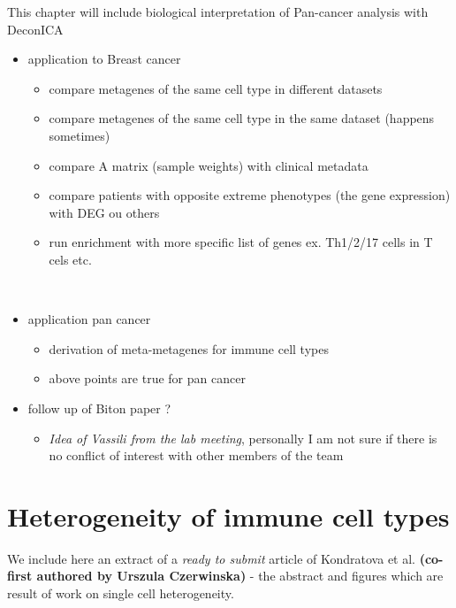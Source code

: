 \documentclass[12pt,]{book}
\providecommand{\tightlist}{%
  \setlength{\itemsep}{0pt}\setlength{\parskip}{0pt}}
\theoremstyle{definition}
\theoremstyle{definition}
\theoremstyle{definition}
\theoremstyle{remark}
\begin{document}
This chapter will include biological interpretation of Pan-cancer
analysis with DeconICA

\begin{itemize}
\item
  application to Breast cancer

  \begin{itemize}
  \item
    compare metagenes of the same cell type in different datasets
  \item
    compare metagenes of the same cell type in the same dataset (happens
    sometimes)
  \item
    compare A matrix (sample weights) with clinical metadata
  \item
    compare patients with opposite extreme phenotypes (the gene
    expression) with DEG ou others
  \item
    run enrichment with more specific list of genes ex. Th1/2/17 cells
    in T cels etc.

    ​
  \end{itemize}
\item
  application pan cancer

  \begin{itemize}
  \tightlist
  \item
    derivation of meta-metagenes for immune cell types
  \item
    above points are true for pan cancer
  \end{itemize}
\item
  follow up of Biton paper ?

  \begin{itemize}
  \tightlist
  \item
    \emph{Idea of Vassili from the lab meeting}, personally I am not
    sure if there is no conflict of interest with other members of the
    team
  \end{itemize}
\end{itemize}

\hypertarget{map}{%
\chapter{Heterogeneity of immune cell types}\label{map}}

We include here an extract of a \emph{ready to submit} article of
Kondratova et al. \textbf{(co-first authored by Urszula Czerwinska)} -
the abstract and figures which are result of work on single cell
heterogeneity.
\end{document}
